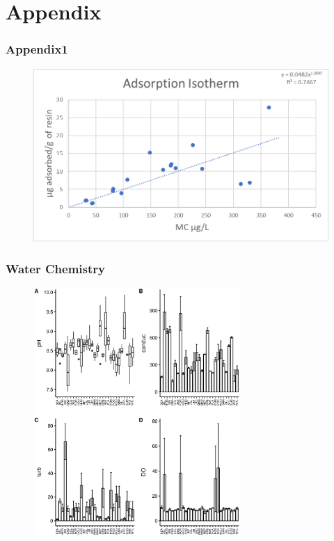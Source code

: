 \section{Appendix}
\begin{frame}
	\frametitle{Appendix1}
	\begin{figure}
	\includegraphics[width=\textwidth]{Isotherm.png}
	\end{figure}	

\end{frame}
\begin{frame}
	\frametitle{Water Chemistry}
	\begin{figure}
		\includegraphics[width=0.7\textwidth,height=\textheight]{../figures/watboxplotlake.eps}
	\end{figure}
\end{frame}
